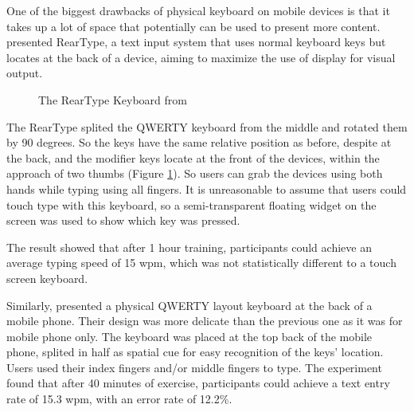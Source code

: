 \documentclass[11pt]{article}
\begin{document}
One of the biggest drawbacks of physical keyboard on mobile devices is that it takes up a lot of space that potentially can be used to present more content. \citet{scott2010reartype} presented RearType, a text input system that uses normal keyboard keys but locates at the back of a device, aiming to maximize the use of display for visual output. 
\begin{figure}[H]
\centering
{}\hfill
{}\hfill
\caption{The RearType Keyboard from \citep{scott2010reartype}} \label{fig:rearType}
\end{figure}
The RearType splited the QWERTY keyboard from the middle and rotated them by 90 degrees. So the keys have the same relative position as before, despite at the back, and the modifier keys locate at the front of the devices, within the approach of two thumbs (Figure \ref{fig:rearType}). So users can grab the devices using both hands while typing using all fingers. It is unreasonable to assume that users could touch type with this keyboard, so a semi-transparent floating widget on the screen was used to show which key was pressed.

The result showed that after 1 hour training, participants could achieve an average typing speed of 15 wpm, which was not statistically different to a touch screen keyboard. 

Similarly, \citet{backkey2012} presented a physical QWERTY layout keyboard at the back of a mobile phone. Their design was more delicate than the previous one as it was for mobile phone only. The keyboard was placed at the top back of the mobile phone, splited in half as spatial cue for easy recognition of the keys' location. Users used their index fingers and/or middle fingers to type. The experiment found that after 40 minutes of exercise, participants could achieve a text entry rate of 15.3 wpm, with an error rate of 12.2\%. 
\end{document}
